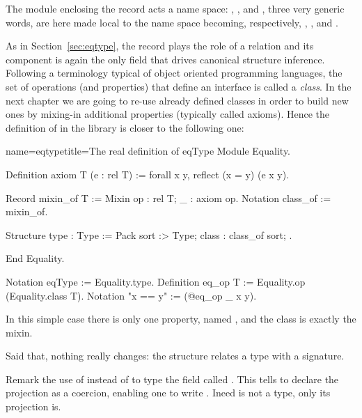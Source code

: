 
The  module enclosing the record acts a name space:
, ,
 and , three very generic words, are here
made local to the  name space becoming, respectively,
, ,  and .

As in Section~\ref{sec:eqtype}, the record plays the role of
a relation and its  component is again the only field
that drives canonical structure inference. Following
a terminology typical of object oriented programming languages,
the set of operations (and properties) that define an interface is
called a \emph{class}.  In the next chapter we are going to re-use already
defined classes in order to build new ones by mixing-in additional
properties (typically called axioms).
Hence the definition of  in the
\mcbMC{} library is closer to the following one:

\begin{coq}{name=eqtype}{title=The real definition of eqType}
Module Equality.

Definition axiom T (e : rel T) := forall x y, reflect (x = y) (e x y).

Record mixin_of T := Mixin {op : rel T; _ : axiom op}.
Notation class_of := mixin_of.

Structure type : Type := Pack {sort :> Type; class : class_of sort; }.

End Equality.

Notation eqType := Equality.type.
Definition eq_op T := Equality.op (Equality.class T).
Notation "x == y" := (@eq_op _ x y).
\end{coq}

In this simple case there is only one property, named
, and the class is exactly the mixin.

Said that, nothing really changes: the  structure
relates a type with a signature.

Remark the use of \C{:>} instead of \C{:} to type the
field called .  This tells \Coq{} to declare the
 projection
as a coercion, enabling one to write .  Ineed  is not a type, only its  projection is.

